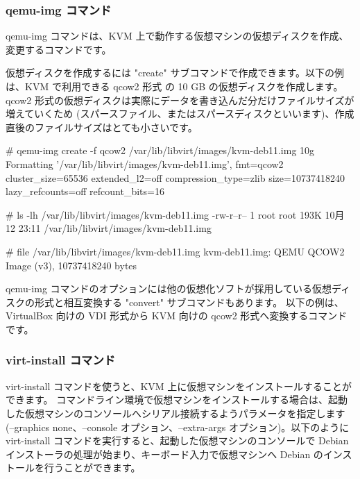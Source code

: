 \documentclass[mingoth,a4paper]{jsarticle}
\begin{document}
\subsubsection{qemu-img コマンド}

qemu-img コマンドは、KVM 上で動作する仮想マシンの仮想ディスクを作成、変更するコマンドです。

仮想ディスクを作成するには "create" サブコマンドで作成できます。以下の例は、KVM で利用できる qcow2 形式 の 10 GB の仮想ディスクを作成します。
qcow2 形式の仮想ディスクは実際にデータを書き込んだ分だけファイルサイズが増えていくため (スパースファイル、またはスパースディスクといいます)、作成直後のファイルサイズはとても小さいです。

\begin{commandline}
# qemu-img create -f qcow2 /var/lib/libvirt/images/kvm-deb11.img 10g
Formatting '/var/lib/libvirt/images/kvm-deb11.img', fmt=qcow2 cluster_size=65536 extended_l2=off
compression_type=zlib size=10737418240 lazy_refcounts=off refcount_bits=16

# ls -lh /var/lib/libvirt/images/kvm-deb11.img
-rw-r--r-- 1 root root 193K 10月 12 23:11 /var/lib/libvirt/images/kvm-deb11.img

# file /var/lib/libvirt/images/kvm-deb11.img
kvm-deb11.img: QEMU QCOW2 Image (v3), 10737418240 bytes
\end{commandline}

qemu-img コマンドのオプションには他の仮想化ソフトが採用している仮想ディスクの形式と相互変換する "convert" サブコマンドもあります。
以下の例は、VirtualBox 向けの VDI 形式から KVM 向けの qcow2 形式へ変換するコマンドです。



\subsubsection{virt-install コマンド}


virt-install コマンドを使うと、KVM 上に仮想マシンをインストールすることができます。
コマンドライン環境で仮想マシンをインストールする場合は、起動した仮想マシンのコンソールへシリアル接続するようパラメータを指定します (--graphics none、--console オプション、--extra-args オプション)。以下のように virt-install コマンドを実行すると、起動した仮想マシンのコンソールで Debian インストーラの処理が始まり、キーボード入力で仮想マシンへ Debian のインストールを行うことができます。
\end{document}
